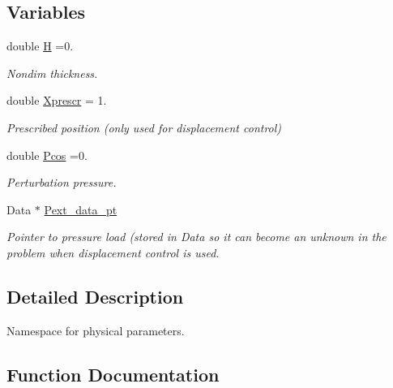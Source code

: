 \subsection*{Variables}
\begin{DoxyCompactItemize}
\item 
double \hyperlink{namespaceGlobal__Physical__Variables_af6e07423e22c0991084d9a2f43727805}{H} =0.
\begin{DoxyCompactList}\small\item\em Nondim thickness. \end{DoxyCompactList}\item 
double \hyperlink{namespaceGlobal__Physical__Variables_a1c774c9cb221df909201e81e84b15f40}{Xprescr} = 1.
\begin{DoxyCompactList}\small\item\em Prescribed position (only used for displacement control) \end{DoxyCompactList}\item 
double \hyperlink{namespaceGlobal__Physical__Variables_ab55734aaa66260cd9d4bf68a4ecafdd5}{Pcos} =0.
\begin{DoxyCompactList}\small\item\em Perturbation pressure. \end{DoxyCompactList}\item 
Data $\ast$ \hyperlink{namespaceGlobal__Physical__Variables_a9d598320fb3d7ecf94101088e8f376d2}{Pext\+\_\+data\+\_\+pt}
\begin{DoxyCompactList}\small\item\em Pointer to pressure load (stored in Data so it can become an unknown in the problem when displacement control is used. \end{DoxyCompactList}\end{DoxyCompactItemize}


\subsection{Detailed Description}
Namespace for physical parameters. 

\subsection{Function Documentation}
\mbox{\label{namespaceGlobal__Physical__Variables_a8c25ac6a672ea50d1b709292d1f4837b}} 
